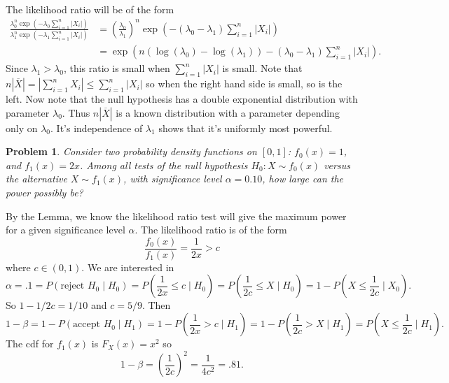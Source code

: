 \documentclass{article}
\newtheorem{problem}{Problem}
\begin{document}
The likelihood ratio will be of the form
\begin{align*}
\frac{\lambda_0^n \exp \left (-\lambda_0 \sum_{i=1}^n |X_i| \right )}{\lambda_1^n \exp \left (-\lambda_1 \sum_{i=1}^n |X_i| \right )}
&= \left ( \frac{\lambda_0}{\lambda_1} \right )^n \exp \left (-(\lambda_0 - \lambda_1)\sum_{i=1}^n |X_i| \right)\\
&= \exp \left (n(\log(\lambda_0) - \log(\lambda_1)) - (\lambda_0 - \lambda_1) \sum_{i=1}^n |X_i| \right ).
\end{align*}
Since $\lambda_1 > \lambda_0$, this ratio is small when $\sum_{i=1}^n |X_i|$ is small. Note that $n |\overline{X}| = \left | \sum_{i=1}^n X_i \right | \leq \sum_{i=1}^n |X_i|$ so when the right hand side is small, so is the left. Now note that the null hypothesis has a double exponential distribution with parameter $\lambda_0$. Thus $n|\overline{X}|$ is a known distribution with a parameter depending only on $\lambda_0$. It's independence of $\lambda_1$ shows that it's uniformly most powerful.

\begin{problem}
Consider two probability density functions on $[0,1]$: $f_0(x) = 1$, and $f_1(x) = 2x$. Among all tests of the null hypothesis $H_0 : X \sim f_0(x)$ versus the alternative $X \sim f_1(x)$, with significance level $\alpha = 0.10$, how large can the power possibly be?
\end{problem}

By the Lemma, we know the likelihood ratio test will give the maximum power for a given significance level $\alpha$. The likelihood ratio is of the form
\[
\frac{f_0(x)}{f_1(x)} = \frac{1}{2x} > c
\]
where $c \in (0,1)$. We are interested in
\[
\alpha = .1 = P(\text{reject } H_0 \mid H_0) = P \left ( \frac{1}{2x} \leq c \mid H_0 \right ) = P \left ( \frac{1}{2c} \leq X \mid H_0 \right) = 1 - P \left ( X \leq \frac{1}{2c} \mid X_0 \right ).
\]
So $1 - 1/2c = 1/10$ and $c = 5/9$. Then
\[
1 - \beta = 1 - P(\text{accept } H_0 \mid H_1) = 1 - P \left ( \frac{1}{2x} > c \mid H_1 \right ) = 1 - P \left ( \frac{1}{2c} > X \mid H_1 \right ) = P \left ( X \leq \frac{1}{2c} \mid H_1 \right ).
\]
The cdf for $f_1(x)$ is $F_X(x) = x^2$ so
\[
1 - \beta = \left ( \frac{1}{2c} \right )^2 = \frac{1}{4c^2} = .81.
\]
\end{document}
